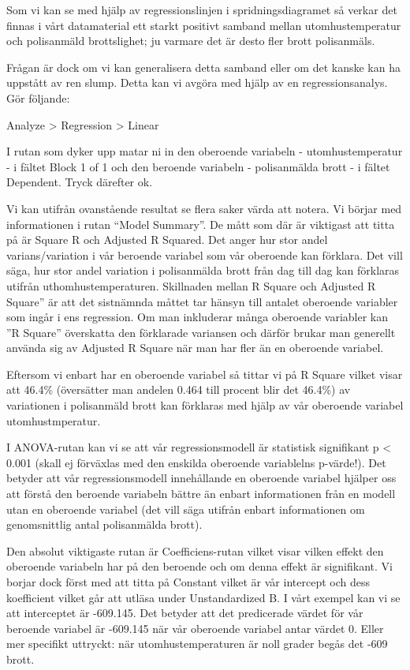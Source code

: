 \documentclass[
]{book}
\begin{document}
Som vi kan se med hjälp av regressionslinjen i spridningsdiagramet så verkar det finnas i vårt datamaterial ett starkt positivt samband mellan utomhustemperatur och polisanmäld brottslighet; ju varmare det är desto fler brott polisanmäls.

Frågan är dock om vi kan generalisera detta samband eller om det kanske kan ha uppstått av ren slump. Detta kan vi avgöra med hjälp av en regressionsanalys. Gör följande:

Analyze \textgreater{} Regression \textgreater{} Linear

I rutan som dyker upp matar ni in den oberoende variabeln - utomhustemperatur - i fältet Block 1 of 1
och den beroende variabeln - polisanmälda brott - i fältet Dependent. Tryck därefter ok.

Vi kan utifrån ovanstående resultat se flera saker värda att notera. Vi börjar med informationen i rutan ``Model Summary''. De mått som där är viktigast att titta på är Square R och Adjusted R Squared. Det anger hur stor andel varians/variation i vår beroende variabel som vår oberoende kan förklara. Det vill säga, hur stor andel variation i polisanmälda brott från dag till dag kan förklaras utifrån uthomhustemperaturen. Skillnaden mellan R Square och Adjusted R Square'' är att det sistnämnda måttet tar hänsyn till antalet oberoende variabler som ingår i ens regression. Om man inkluderar många oberoende variabler kan ''R Square'' överskatta den förklarade variansen och därför brukar man generellt använda sig av Adjusted R Square när man har fler än en oberoende variabel.

Eftersom vi enbart har en oberoende variabel så tittar vi på R Square vilket visar att 46.4\% (översätter man andelen 0.464 till procent blir det 46.4\%) av variationen i polisanmäld brott kan förklaras med hjälp av vår oberoende variabel utomhustmperatur.

I ANOVA-rutan kan vi se att vår regressionsmodell är statistisk signifikant p \textless{} 0.001 (skall ej förväxlas med den enskilda oberoende variablelns p-värde!). Det betyder att vår regressionsmodell innehållande en oberoende variabel hjälper oss att förstå den beroende variabeln bättre än enbart informationen från en modell utan en oberoende variabel (det vill säga utifrån enbart informationen om genomsnittlig antal polisanmälda brott).

Den absolut viktigaste rutan är Coefficiens-rutan vilket visar vilken effekt den oberoende variabeln har på den beroende och om denna effekt är signifikant. Vi borjar dock först med att titta på Constant vilket är vår intercept och dess koefficient vilket går att utläsa under Unstandardized B. I vårt exempel kan vi se att interceptet är -609.145. Det betyder att det predicerade värdet för vår beroende variabel är -609.145 när vår oberoende variabel antar värdet 0. Eller mer specifikt uttryckt: när utomhustemperaturen är noll grader begås det -609 brott.
\end{document}
